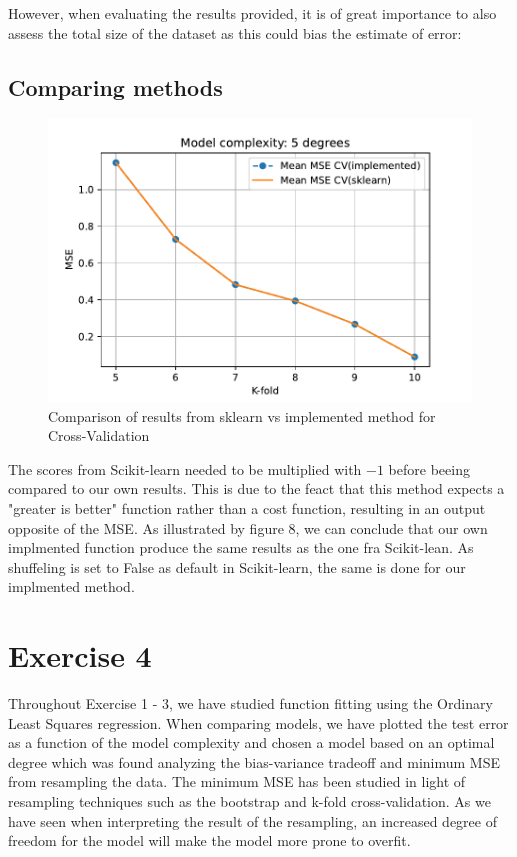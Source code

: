 \documentclass[11pt, a4paper]{article}
\begin{document}
However, when evaluating the results provided, it is of great importance to also assess the total size of the dataset as this could bias the estimate of error:

\subsection*{Comparing methods}



\begin{figure}[h]
  \centering
  \includegraphics[scale=0.75]{figures/EX3_sk_vs_implemented_CV.pdf}
  \caption{\label{fig:?}Comparison of results from sklearn vs implemented method for Cross-Validation}
\end{figure}


The scores from Scikit-learn needed to be multiplied with $-1$ before beeing compared to our own results. This is due to the feact that this method expects a "greater is better" function rather than a cost function, resulting in an output opposite of the MSE.\cite{Geron2019} As illustrated by figure 8, we can conclude that our own implmented function produce the same results as the one fra Scikit-lean. As shuffeling is set to False as default in Scikit-learn, the same is done for our implmented method.





\section*{Exercise 4}
Throughout Exercise 1 - 3, we have studied function fitting using the Ordinary Least Squares regression. When comparing models, we have plotted the test error as a function of the model complexity and chosen a model based on an optimal degree which was found analyzing the bias-variance tradeoff and minimum MSE from resampling the data. The minimum MSE has been studied in light of resampling techniques such as the bootstrap and k-fold cross-validation. As we have seen when interpreting the result of the resampling, an increased degree of freedom for the model will make the model more prone to overfit.
\end{document}
